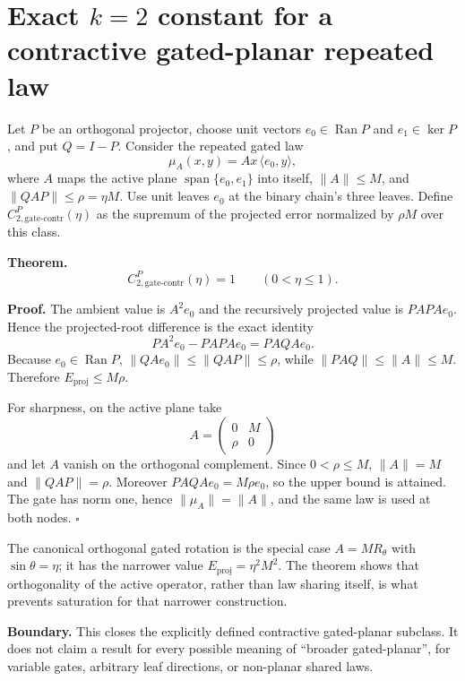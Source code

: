 \section*{Exact $k=2$ constant for a contractive gated-planar repeated law}
\label{sec:m17-gated-contraction}

Let $P$ be an orthogonal projector, choose unit vectors
$e_0\in\operatorname{Ran}P$ and $e_1\in\ker P$, and put $Q=I-P$.  Consider
the repeated gated law
\[
  \mu_A(x,y)=A x\,\langle e_0,y\rangle,
\]
where $A$ maps the active plane
$\operatorname{span}\{e_0,e_1\}$ into itself, $\|A\|\le M$, and
$\|QAP\|\le\rho=\eta M$.  Use unit leaves $e_0$ at the binary chain's
three leaves.  Define $C_{2,\mathrm{gate\text{-}contr}}^P(\eta)$ as the
supremum of the projected error normalized by $\rho M$ over this class.

\textbf{Theorem.}
\[
  \boxed{C_{2,\mathrm{gate\text{-}contr}}^P(\eta)=1
  \qquad(0<\eta\le1).}
\]

\textbf{Proof.}  The ambient value is $A^2e_0$ and the recursively
projected value is $PAPAe_0$.  Hence the projected-root difference is the
exact identity
\[
  P A^2e_0-PAPAe_0=PAQ A e_0.
\]
Because $e_0\in\operatorname{Ran}P$,
$\|Q A e_0\|\le\|QAP\|\le\rho$, while
$\|PAQ\|\le\|A\|\le M$.  Therefore
$E_{\mathrm{proj}}\le M\rho$.

For sharpness, on the active plane take
\[
  A=\begin{pmatrix}0&M\\\rho&0\end{pmatrix}
\]
and let $A$ vanish on the orthogonal complement.  Since $0<\rho\le M$,
$\|A\|=M$ and $\|QAP\|=\rho$.  Moreover
$PAQ A e_0=M\rho e_0$, so the upper bound is attained.  The gate has norm
one, hence $\|\mu_A\|=\|A\|$, and the same law is used at both nodes.
\hfill$\square$

The canonical orthogonal gated rotation is the special case
$A=M R_\theta$ with $\sin\theta=\eta$; it has the narrower value
$E_{\mathrm{proj}}=\eta^2M^2$.  The theorem shows that orthogonality of the
active operator, rather than law sharing itself, is what prevents saturation
for that narrower construction.

\textbf{Boundary.}  This closes the explicitly defined contractive gated-planar
subclass.  It does not claim a result for every possible meaning of
``broader gated-planar'', for variable gates, arbitrary leaf directions, or
non-planar shared laws.
